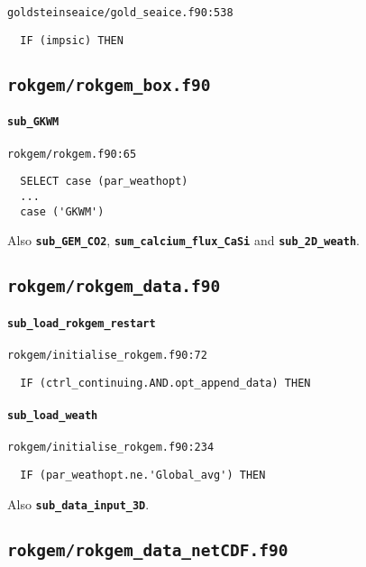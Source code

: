 \documentclass[a4paper,10pt,article]{memoir}
\begin{document}
\texttt{goldsteinseaice/gold\_seaice.f90:538}

\begin{verbatim}
  IF (impsic) THEN
\end{verbatim}


\subsection*{\texttt{rokgem/rokgem\_box.f90}}

\paragraph{\texttt{sub\_GKWM}}

\texttt{rokgem/rokgem.f90:65}

\begin{verbatim}
  SELECT case (par_weathopt)
  ...
  case ('GKWM')
\end{verbatim}

Also \textbf{\texttt{sub\_GEM\_CO2}},
\textbf{\texttt{sum\_calcium\_flux\_CaSi}} and
\textbf{\texttt{sub\_2D\_weath}}.


\subsection*{\texttt{rokgem/rokgem\_data.f90}}

\paragraph{\texttt{sub\_load\_rokgem\_restart}}

\texttt{rokgem/initialise\_rokgem.f90:72}

\begin{verbatim}
  IF (ctrl_continuing.AND.opt_append_data) THEN
\end{verbatim}

\paragraph{\texttt{sub\_load\_weath}}

\texttt{rokgem/initialise\_rokgem.f90:234}

\begin{verbatim}
  IF (par_weathopt.ne.'Global_avg') THEN
\end{verbatim}

Also \textbf{\texttt{sub\_data\_input\_3D}}.


\subsection*{\texttt{rokgem/rokgem\_data\_netCDF.f90}}
\end{document}
